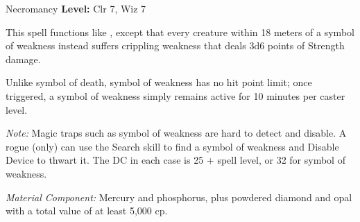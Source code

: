 {Necromancy}
{
	\textbf{Level:}
	Clr 7, Wiz 7\\
}
{
	This spell functions like , except that every creature within 18 meters of a symbol of weakness instead suffers crippling weakness that deals 3d6 points of Strength damage.

	Unlike symbol of death, symbol of weakness has no hit point limit; once triggered, a symbol of weakness simply remains active for 10 minutes per caster level.

	\textit{Note:} Magic traps such as symbol of weakness are hard to detect and disable. A rogue (only) can use the Search skill to find a symbol of weakness and Disable Device to thwart it. The DC in each case is 25 + spell level, or 32 for symbol of weakness.

	\textit{Material Component:}
	Mercury and phosphorus, plus powdered diamond and opal with a total value of at least 5,000 cp.

}
